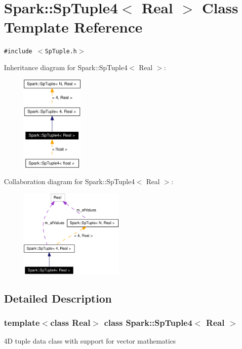 \section{Spark::Sp\-Tuple4$<$ Real $>$ Class Template Reference}
\label{classSpark_1_1SpTuple4}
{\tt \#include $<$Sp\-Tuple.h$>$}

Inheritance diagram for Spark::Sp\-Tuple4$<$ Real $>$:\begin{figure}[H]
\begin{center}
\leavevmode
\includegraphics[width=86pt]{classSpark_1_1SpTuple4__inherit__graph}
\end{center}
\end{figure}
Collaboration diagram for Spark::Sp\-Tuple4$<$ Real $>$:\begin{figure}[H]
\begin{center}
\leavevmode
\includegraphics[width=144pt]{classSpark_1_1SpTuple4__coll__graph}
\end{center}
\end{figure}


\subsection{Detailed Description}
\subsubsection*{template$<$class Real$>$ class Spark::Sp\-Tuple4$<$ Real $>$}

4D tuple data class with support for vector mathematics 


